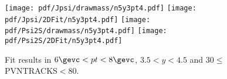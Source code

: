 \begin{figure}[H]
\begin{center}
\texttt{[image: pdf/Jpsi/drawmass/n5y3pt4.pdf]}
\texttt{[image: pdf/Jpsi/2DFit/n5y3pt4.pdf]}
\vspace*{-0.5cm}
\texttt{[image: pdf/Psi2S/drawmass/n5y3pt4.pdf]}
\texttt{[image: pdf/Psi2S/2DFit/n5y3pt4.pdf]}
\vspace*{-0.5cm}
\end{center}
\caption{Fit results in $6\gevc<pt<8\gevc$, $3.5<y<4.5$ and 30$\leq$PVNTRACKS$<$80.}
\label{Fitn5y3pt4}
\end{figure}
